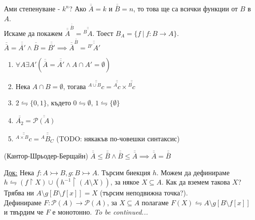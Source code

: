 \documentclass[fleqn, titlepage, 12pt]{report}
\begin{document}
 Ами степенуване - $k^n$? Ако $\overline{\overline{A}} = k$ и $\overline{\overline{B}} = n$, то това ще са всички функции от $B$ в $A$. \\
Искаме да покажем $\overline{\overline{A}}^{\overline{\overline{B}}} = \overline{\overline{^B A}}$.
Тоест $B_A = \{f\ |\ f: B \rightarrow A\}$.\\
$\overline{\overline{A}} = \overline{\overline{A'}} \land \overline{\overline{B}} = \overline{\overline{B'}} \implies
\overline{\overline{A}}^{\overline{\overline{B}}} = \overline{\overline{^{B'} A'}}$\\
\bigbreak

\begin{enumerate}
  \item $\forall{A}\exists{A'}(\overline{\overline{A}} = \overline{\overline{A'}} \land A \cap A' = \emptyset)$
  \item Нека $A \cap B = \emptyset$, тогава $ \overline{\overline{^{A \cup B}c}} = \overline{\overline{^A c}} \times  \overline{\overline{^B c}}$
  \item $2 \leftrightharpoons \{ 0, 1 \}$, където $0 \leftrightharpoons \emptyset$, $1 \leftrightharpoons \{ \emptyset \}$
  \item $\overline{\overline{A_2}} = \overline{\overline{\mathcal{P}(A)}}$
  \item $\overline{\overline{^{A \times B} c}} = \overline{\overline{^{A} B _C}}$ (TODO: някакъв по-човешки синтаксис)
\end{enumerate}

 (Кантор-Шрьодер-Берщайн)
$\overline{\overline{A}} \leq \overline{\overline{B}} \land \overline{\overline{B}} \leq \overline{\overline{A}} \implies \overline{\overline{A}} = \overline{\overline{B}}$
\bigbreak

\underline{Док:} Нека $f: A \rightarrowtail B, g: B \rightarrowtail A$. Търсим биекция $h$. Можем да дефинираме \\
$h \leftrightharpoons (f \upharpoonright X) \cup (h^{-1} \upharpoonright (A \setminus X))$, за някое $X \subseteq A$.
Как да вземем такова $X$? Трябва ни $A \setminus g[B \setminus f[x]] = X$ (търсим неподвижна точка?).\\
Дефинираме $F: \mathcal{P}(A) \rightarrow \mathcal{P}(A)$, за $X \subseteq A$ полагаме
$F(X) \leftrightharpoons A \setminus g[B \setminus f[x]]$ и твърдим че $F$ е монотонно. \textit{To be continued...} \\
\end{document}
